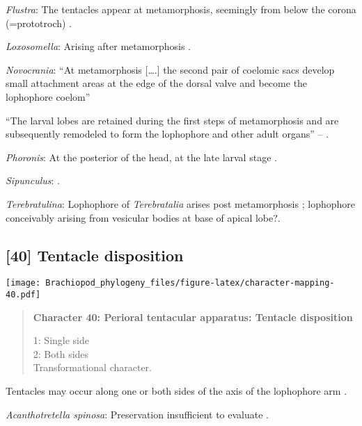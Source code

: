 \documentclass[openany]{book}
\theoremstyle{definition}
\theoremstyle{definition}
\theoremstyle{definition}
\theoremstyle{remark}
\begin{document}
\hypertarget{Flustra-coding-39}{}
\emph{Flustra}: The tentacles appear at metamorphosis, seemingly from
below the corona (=prototroch) \citep{Young2002}.

\hypertarget{Loxosomella-coding-39}{}
\emph{Loxosomella}: Arising after metamorphosis \citep{Nielsen1971}.

\hypertarget{Novocrania-coding-39}{}
\emph{Novocrania}: ``At metamorphosis {[}\ldots{}.{]} the second pair of
coelomic sacs develop small attachment areas at the edge of the dorsal
valve and become the lophophore coelom'' \citep{Nielsen1991}

``The larval lobes are retained during the first steps of metamorphosis
and are\\
subsequently remodeled to form the lophophore and other adult organs''
-- \citet{Altenburger2013}.

\hypertarget{Phoronis-coding-39}{}
\emph{Phoronis}: At the posterior of the head, at the late larval stage
\citep{Santagata2004}.

\hypertarget{Sipunculus-coding-39}{}
\emph{Sipunculus}: \citep{Adrianov2006}.

\hypertarget{Terebratulina-coding-39}{}
\emph{Terebratulina}: Lophophore of \emph{Terebratalia} arises post
metamorphosis \citep{Young2002}; lophophore conceivably arising from
vesicular bodies at base of apical lobe?.

\subsection*{{[}40{]} Tentacle disposition}\label{tentacle-disposition}

\texttt{[image: Brachiopod\_phylogeny\_files/figure-latex/character-mapping-40.pdf]}

\begin{quote}
\textbf{Character 40: Perioral tentacular apparatus: Tentacle
disposition}

1: Single side\\
2: Both sides\\
Transformational character.
\end{quote}

Tentacles may occur along one or both sides of the axis of the
lophophore arm \citep{Carlson1995Phylogeneticrelationships}.

\hypertarget{Acanthotretella_spinosa-coding-40}{}
\emph{Acanthotretella spinosa}: Preservation insufficient to evaluate
\citep{Holmer2006Aspinose}.
\end{document}
